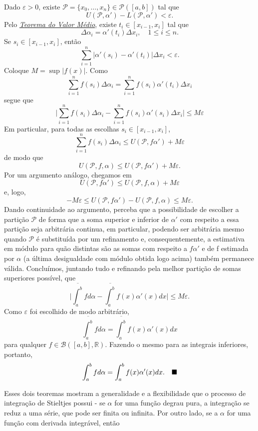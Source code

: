 \documentclass[analysis_notes.tex]{subfiles}
\begin{document}
\begin{proof*}
	Dado \(\varepsilon > 0\), existe \(\mathcal{P}=\{x_{0},\dotsc ,x_{n}\}\in \mathcal{P}([a,b]) \) tal que
	\[
		U(\mathcal{P}, \alpha ')-L(\mathcal{P}, \alpha ')<\varepsilon .
	\]
	Pelo \hyperlink{mean_value}{\textit{Teorema do Valor Médio}}, existe \(t_{i}\in[x_{i-1}, x_{i}]\) tal que
	\[
		\Delta \alpha_{i}=\alpha '(t_{i})\Delta x_{i},\quad 1\leq i\leq n.
	\]
	Se \(s_{i}\in [x_{i-1}, x_{i}]\), então
	\[
		\sum\limits_{i=1}^{n}|\alpha '(s_{i})-\alpha '(t_{i})|\Delta x_{i}<\varepsilon .
	\]
	Coloque \(M=\sup_{}|f(x)|\). Como
	\[
		\sum\limits_{i=1}^{n}f(s_{i})\Delta \alpha_{i}=\sum\limits_{i=1}^{n}f(s_{i})\alpha '(t_{i})\Delta x_{i}
	\]
	segue que
	\[
		\biggl\vert \sum\limits_{i=1}^{n}f(s_{i})\Delta \alpha_{i}-\sum\limits_{i=1}^{n}f(s_{i})\alpha '(s_{i})\Delta x_{i} \biggr\vert\leq M \varepsilon
	\]
	Em particular, para todas as escolhas \(s_{i}\in[x_{i-1},x_{i}]\),
	\[
		\sum\limits_{i=1}^{n}f(s_{i})\Delta \alpha_{i}\leq U(\mathcal{P}, f\alpha ')+M\varepsilon
	\]
	de modo que
	\[
		U(\mathcal{P}, f, \alpha )\leq U(\mathcal{P}, f\alpha ')+M\varepsilon .
	\]
	Por um argumento análogo, chegamos em
	\[
		U(\mathcal{P}, f\alpha ')\leq U(\mathcal{P}, f, \alpha )+M\varepsilon
	\]
	e, logo,
	\[
		-M\varepsilon \leq U(\mathcal{P}, f\alpha ')-U(\mathcal{P}, f, \alpha )\leq M\varepsilon .
	\]
	Dando continuidade ao argumento, perceba que a possibilidade de escolher a partição \(\mathcal{P}\) de forma que a soma superior e inferior de \(\alpha '\) com respeito a essa partição seja arbitrária continua, em particular,
	podendo ser arbitrária mesmo quando \(\mathcal{P}\) é substituída por um refinamento e, consequentemente, a estimativa em módulo para quão distintas são as somas com respeito a \(f\alpha '\) e de f estimada por \(\alpha \) (a última desigualdade com módulo
	obtida logo acima) também permanece válida. Concluímos, juntando tudo e refinando pela melhor partição de somas superiores possível, que
	\[
		\biggl\vert \overline{\int_{a}^{b}}fd\alpha - \overline{\int_{a}^{b}}f(x)\alpha '(x)dx \biggr\vert\leq M\varepsilon .
	\]
	Como \(\varepsilon \) foi escolhido de modo arbitrário,
	\[
		\overline{\int_{a}^{b}}fd\alpha = \overline{\int_{a}^{b}}f(x)\alpha '(x)dx
	\]
	para qualquer \(f\in \mathcal{B}([a, b], \mathbb{R})\). Fazendo o mesmo para as integrais inferiores, portanto,
	\[
		\int_{a}^{b}fd\alpha = \int_{a}^{b}f(x)\alpha '(x)dx.\quad \text{$\blacksquare$}
	\]
\end{proof*}
Esses dois teoremas mostram a generalidade e a flexibilidade que o processo de integração de Stieltjes possui - se \(\alpha \) for uma função degrau pura, a integração se reduz a uma série, que pode ser finita ou infinita. Por outro lado, se a \(\alpha \) for uma função com derivada integrável, então
\end{document}
